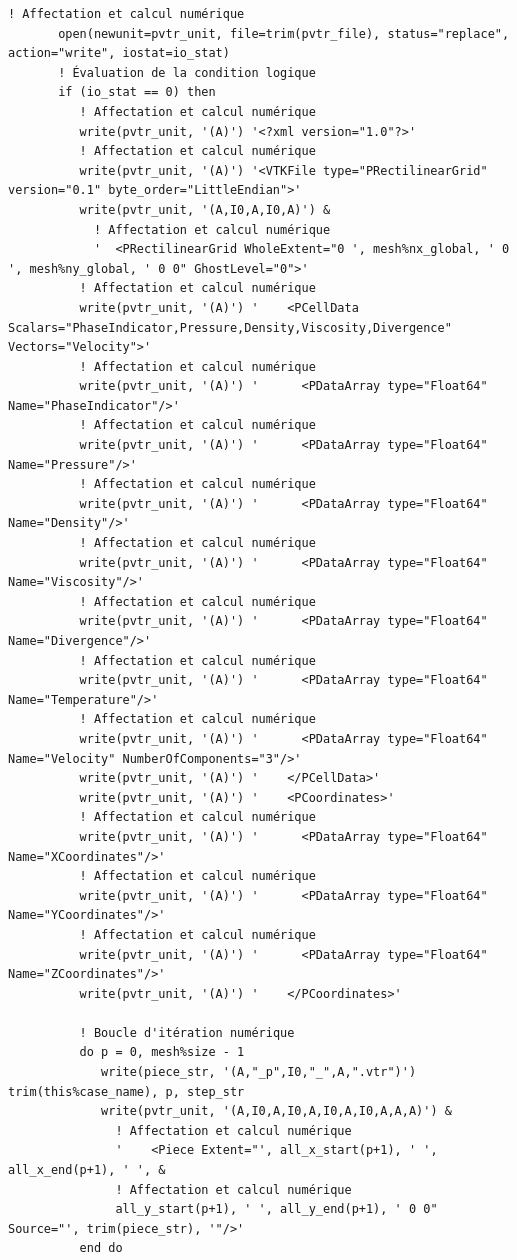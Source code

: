 \documentclass[10pt,a4paper,oneside]{book}
\begin{document}
\begin{lstlisting}[language={[95]Fortran}]
       ! Affectation et calcul numérique
       open(newunit=pvtr_unit, file=trim(pvtr_file), status="replace", action="write", iostat=io_stat)
       ! Évaluation de la condition logique
       if (io_stat == 0) then
          ! Affectation et calcul numérique
          write(pvtr_unit, '(A)') '<?xml version="1.0"?>'
          ! Affectation et calcul numérique
          write(pvtr_unit, '(A)') '<VTKFile type="PRectilinearGrid" version="0.1" byte_order="LittleEndian">'
          write(pvtr_unit, '(A,I0,A,I0,A)') &
            ! Affectation et calcul numérique
            '  <PRectilinearGrid WholeExtent="0 ', mesh%nx_global, ' 0 ', mesh%ny_global, ' 0 0" GhostLevel="0">'
          ! Affectation et calcul numérique
          write(pvtr_unit, '(A)') '    <PCellData Scalars="PhaseIndicator,Pressure,Density,Viscosity,Divergence" Vectors="Velocity">'
          ! Affectation et calcul numérique
          write(pvtr_unit, '(A)') '      <PDataArray type="Float64" Name="PhaseIndicator"/>'
          ! Affectation et calcul numérique
          write(pvtr_unit, '(A)') '      <PDataArray type="Float64" Name="Pressure"/>'
          ! Affectation et calcul numérique
          write(pvtr_unit, '(A)') '      <PDataArray type="Float64" Name="Density"/>'
          ! Affectation et calcul numérique
          write(pvtr_unit, '(A)') '      <PDataArray type="Float64" Name="Viscosity"/>'
          ! Affectation et calcul numérique
          write(pvtr_unit, '(A)') '      <PDataArray type="Float64" Name="Divergence"/>'
          ! Affectation et calcul numérique
          write(pvtr_unit, '(A)') '      <PDataArray type="Float64" Name="Temperature"/>'
          ! Affectation et calcul numérique
          write(pvtr_unit, '(A)') '      <PDataArray type="Float64" Name="Velocity" NumberOfComponents="3"/>'
          write(pvtr_unit, '(A)') '    </PCellData>'
          write(pvtr_unit, '(A)') '    <PCoordinates>'
          ! Affectation et calcul numérique
          write(pvtr_unit, '(A)') '      <PDataArray type="Float64" Name="XCoordinates"/>'
          ! Affectation et calcul numérique
          write(pvtr_unit, '(A)') '      <PDataArray type="Float64" Name="YCoordinates"/>'
          ! Affectation et calcul numérique
          write(pvtr_unit, '(A)') '      <PDataArray type="Float64" Name="ZCoordinates"/>'
          write(pvtr_unit, '(A)') '    </PCoordinates>'

          ! Boucle d'itération numérique
          do p = 0, mesh%size - 1
             write(piece_str, '(A,"_p",I0,"_",A,".vtr")') trim(this%case_name), p, step_str
             write(pvtr_unit, '(A,I0,A,I0,A,I0,A,I0,A,A,A)') &
               ! Affectation et calcul numérique
               '    <Piece Extent="', all_x_start(p+1), ' ', all_x_end(p+1), ' ', &
               ! Affectation et calcul numérique
               all_y_start(p+1), ' ', all_y_end(p+1), ' 0 0" Source="', trim(piece_str), '"/>'
          end do


\end{lstlisting}
\end{document}
